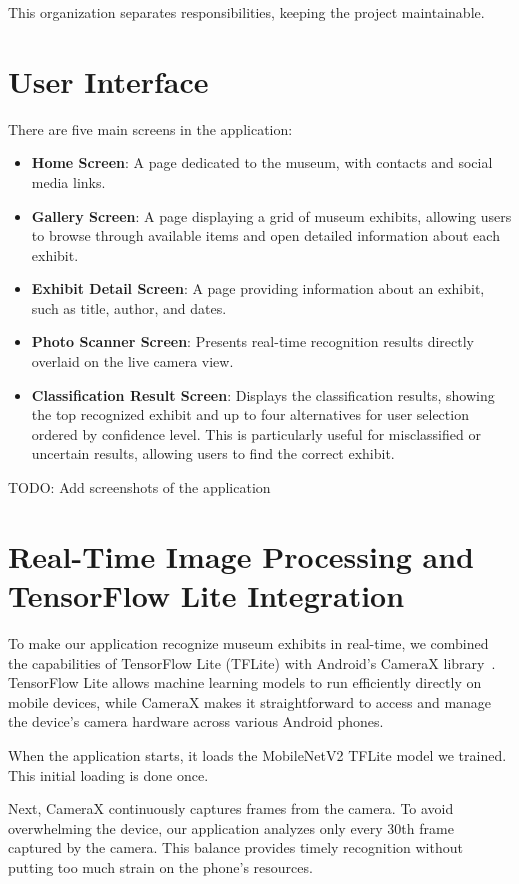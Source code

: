 This organization separates responsibilities, keeping the project maintainable.

\section{User Interface}

There are five main screens in the application:

\begin{itemize}
\item \textbf{Home Screen}: A page dedicated to the museum, with contacts and social media links.
\item \textbf{Gallery Screen}: A page displaying a grid of museum exhibits, allowing users to browse through available items and open detailed information about each exhibit.
\item \textbf{Exhibit Detail Screen}: A page providing information about an exhibit, such as title, author, and dates.
\item \textbf{Photo Scanner Screen}: Presents real-time recognition results directly overlaid on the live camera view.
\item \textbf{Classification Result Screen}: Displays the classification results, showing the top recognized exhibit and up to four alternatives for user selection ordered by confidence level. This is particularly useful for misclassified or uncertain results, allowing users to find the correct exhibit.
\end{itemize}

TODO: Add screenshots of the application

\section{Real-Time Image Processing and TensorFlow Lite Integration}

To make our application recognize museum exhibits in real-time, we combined the capabilities of TensorFlow Lite (TFLite) with Android's CameraX library~\cite{camerax}. TensorFlow Lite allows machine learning models to run efficiently directly on mobile devices, while CameraX makes it straightforward to access and manage the device's camera hardware across various Android phones.

When the application starts, it loads the MobileNetV2 TFLite model we trained. This initial loading is done once.

Next, CameraX continuously captures frames from the camera. To avoid overwhelming the device, our application analyzes only every 30th frame captured by the camera. This balance provides timely recognition without putting too much strain on the phone's resources.

